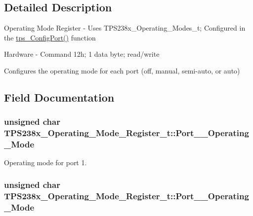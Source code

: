 \subsection{Detailed Description}
Operating Mode Register -\/ Uses T\-P\-S238x\-\_\-\-Operating\-\_\-\-Modes\-\_\-t; Configured in the \hyperlink{_t_p_s23861_8c_a2b787818ef7e374af218c952d3ca8a08}{tps\-\_\-\-Config\-Port()} function \par
 Hardware -\/ Command 12h; 1 data byte; read/write \par
\par
 Configures the operating mode for each port (off, manual, semi-\/auto, or auto) 

\subsection{Field Documentation}
\hypertarget{struct_t_p_s238x___operating___mode___register__t_aacbe984ebf84f291788cc29c366b7617}{
\subsubsection[{Port\-\_\-1\-\_\-\-Operating\-\_\-\-Mode}]{\setlength{\rightskip}{0pt plus 5cm}unsigned char T\-P\-S238x\-\_\-\-Operating\-\_\-\-Mode\-\_\-\-Register\-\_\-t\-::\-Port\-\_\-\_\-\-Operating\-\_\-\-Mode}}\label{struct_t_p_s238x___operating___mode___register__t_aacbe984ebf84f291788cc29c366b7617}


Operating mode for port 1. 

\hypertarget{struct_t_p_s238x___operating___mode___register__t_a20ef74c548a17384ae43c2a3e71d3897}{
\subsubsection[{Port\-\_\-2\-\_\-\-Operating\-\_\-\-Mode}]{\setlength{\rightskip}{0pt plus 5cm}unsigned char T\-P\-S238x\-\_\-\-Operating\-\_\-\-Mode\-\_\-\-Register\-\_\-t\-::\-Port\-\_\-\_\-\-Operating\-\_\-\-Mode}}\label{struct_t_p_s238x___operating___mode___register__t_a20ef74c548a17384ae43c2a3e71d3897}


